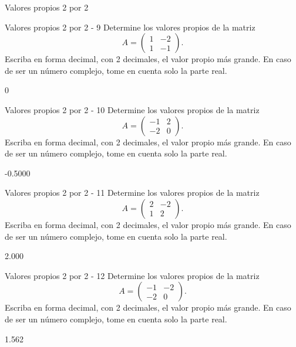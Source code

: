 \documentclass[a4,11pt]{aleph-notas}
\begin{document}
\begin{quiz}{Valores propios 2 por 2}
\begin{numerical}[tolerance=0.01]%
    {Valores propios 2 por 2 - 9}
    Determine los valores propios de la matriz
    \[
    A = \begin{pmatrix}
    1 & -2 \\
    1 & -1
    \end{pmatrix}.
    \]
    Escriba en forma decimal, con 2 decimales, el valor propio más grande. En caso de ser un número complejo, tome en cuenta solo la parte real.
    \item[] 0
\end{numerical}

\begin{numerical}[tolerance=0.01]%
    {Valores propios 2 por 2 - 10}
    Determine los valores propios de la matriz
    \[
    A = \begin{pmatrix}
    -1 & 2 \\
    -2 & 0
    \end{pmatrix}.
    \]
    Escriba en forma decimal, con 2 decimales, el valor propio más grande. En caso de ser un número complejo, tome en cuenta solo la parte real.
    \item[] -0.5000
\end{numerical}

\begin{numerical}[tolerance=0.01]%
    {Valores propios 2 por 2 - 11}
    Determine los valores propios de la matriz
    \[
    A = \begin{pmatrix}
    2 & -2 \\
    1 & 2
    \end{pmatrix}.
    \]
    Escriba en forma decimal, con 2 decimales, el valor propio más grande. En caso de ser un número complejo, tome en cuenta solo la parte real.
    \item[] 2.000
\end{numerical}

\begin{numerical}[tolerance=0.01]%
    {Valores propios 2 por 2 - 12}
    Determine los valores propios de la matriz
    \[
    A = \begin{pmatrix}
    -1 & -2 \\
    -2 & 0
    \end{pmatrix}.
    \]
    Escriba en forma decimal, con 2 decimales, el valor propio más grande. En caso de ser un número complejo, tome en cuenta solo la parte real.
    \item[] 1.562
\end{numerical}


\end{quiz}
\end{document}
